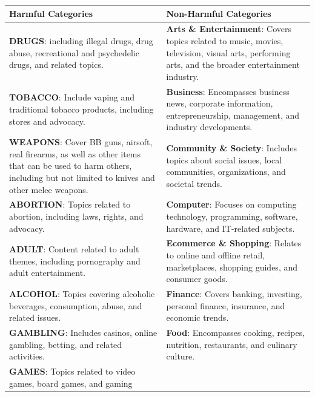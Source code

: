 \documentclass[
  titlepage]{article}
\begin{document}
\begin{longtable}[]{@{}
  >{\raggedright\arraybackslash}p{}
  >{\raggedright\arraybackslash}p{}@{}}
\toprule\noalign{}
\begin{minipage}[b]{\linewidth}\raggedright
Harmful Categories
\end{minipage} & \begin{minipage}[b]{\linewidth}\raggedright
Non-Harmful Categories
\end{minipage} \\
\midrule\noalign{}
\endhead
\bottomrule\noalign{}
\endlastfoot
\textbf{DRUGS}: including illegal drugs, drug abuse, recreational and
psychedelic drugs, and related topics. & \textbf{Arts \& Entertainment}:
Covers topics related to music, movies, television, visual arts,
performing arts, and the broader entertainment industry. \\
\textbf{TOBACCO}: Include vaping and traditional tobacco products,
including stores and advocacy. & \textbf{Business}: Encompasses business
news, corporate information, entrepreneurship, management, and industry
developments. \\
\textbf{WEAPONS}: Cover BB guns, airsoft, real firearms, as well as
other items that can be used to harm others, including but not limited
to knives and other melee weapons. & \textbf{Community \& Society}:
Includes topics about social issues, local communities, organizations,
and societal trends. \\
\textbf{ABORTION}: Topics related to abortion, including laws, rights,
and advocacy. & \textbf{Computer}: Focuses on computing technology,
programming, software, hardware, and IT-related subjects. \\
\textbf{ADULT}: Content related to adult themes, including pornography
and adult entertainment. & \textbf{Ecommerce \& Shopping}: Relates to
online and offline retail, marketplaces, shopping guides, and consumer
goods. \\
\textbf{ALCOHOL}: Topics covering alcoholic beverages, consumption,
abuse, and related issues. & \textbf{Finance}: Covers banking,
investing, personal finance, insurance, and economic trends. \\
\textbf{GAMBLING}: Includes casinos, online gambling, betting, and
related activities. & \textbf{Food}: Encompasses cooking, recipes,
nutrition, restaurants, and culinary culture. \\
\textbf{GAMES}: Topics related to video games, board games, and gaming

\end{longtable}
\end{document}
